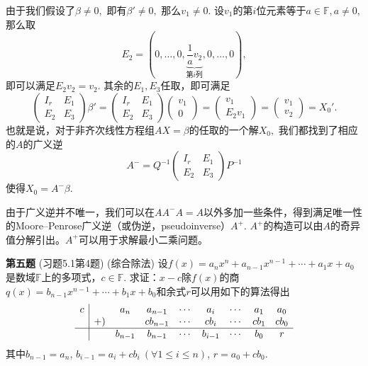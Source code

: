 由于我们假设了$\beta \neq 0,$ 即有$\beta' \neq 0,$ 那么$v_1 \neq 0$. 设$v_1$的第$i$位元素等于$a \in \mathbb{F}, a \neq 0,$ 那么取
$$E_2 = (0, \ldots, 0, \underbrace{\dfrac{1}{a}v_2}_{\text{第$i$列}}, 0, \ldots, 0),$$
即可以满足$E_2v_2 = v_2.$ 其余的$E_1, E_3$任取，即可满足
$$\begin{pmatrix} I_r & E_1 \\ E_2 & E_3 \end{pmatrix} \beta' = \begin{pmatrix} I_r & E_1 \\ E_2 & E_3 \end{pmatrix} \begin{pmatrix} v_1 \\ 0 \end{pmatrix} = \begin{pmatrix} v_1 \\ E_2v_1 \end{pmatrix} = \begin{pmatrix} v_1 \\ v_2 \end{pmatrix} = X_0'.$$
也就是说，对于非齐次线性方程组$AX = \beta$的任取的一个解$X_0,$ 我们都找到了相应的$A$的广义逆
$$A^- = Q^{-1} \begin{pmatrix} I_r & E_1 \\ E_2 & E_3 \end{pmatrix} P^{-1}$$
使得$X_0 = A^-\beta.$

\vspace{1em}

由于广义逆并不唯一，我们可以在$AA^-A = A$以外多加一些条件，得到满足唯一性的Moore–Penrose广义逆（或伪逆，pseudoinverse）$A^+.$ $A^+$的构造可以由$A$的奇异值分解引出。$A^+$可以用于求解最小二乘问题。

\fi  %

\newpageorvspace

{\bf 第五题} (习题5.1第4题) (综合除法) 设$f(x) = a_nx^n + a_{n-1}x^{n-1} + \cdots + a_1x + a_0$是数域$\mathbb{F}$上的多项式，$c\in\mathbb{F}$. 求证：$x-c$除$f(x)$的商$q(x) = b_{n-1}x^{n-1} + \cdots + b_1x + b_0$和余式$r$可以用如下的算法得出
$$
\begin{array}{c|cccccccc}
c & & a_n & a_{n-1} & \cdots & a_i & \cdots & a_1 & a_0 \\
& +) & & cb_{n-1} & \cdots & cb_i & \cdots & cb_1 & cb_0 \\ \hline
& & b_{n-1} & b_{n-1} & \cdots & b_{i-1} & \cdots & b_0 & r
\end{array}
$$
其中$b_{n-1} = a_n$, $b_{i-1} = a_i + cb_i \ (\forall 1 \leqslant i \leqslant n)$, $r = a_0 + cb_0$.

